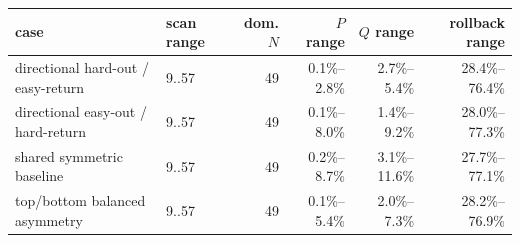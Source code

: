 \begin{tabular}{llrrrr}
\toprule
case & scan range & dom. $N$ & $P$ range & $Q$ range & rollback range \\
\midrule
directional hard-out / easy-return & 9..57 & 49 & 0.1\%--2.8\% & 2.7\%--5.4\% & 28.4\%--76.4\% \\
directional easy-out / hard-return & 9..57 & 49 & 0.1\%--8.0\% & 1.4\%--9.2\% & 28.0\%--77.3\% \\
shared symmetric baseline & 9..57 & 49 & 0.2\%--8.7\% & 3.1\%--11.6\% & 27.7\%--77.1\% \\
top/bottom balanced asymmetry & 9..57 & 49 & 0.1\%--5.4\% & 2.0\%--7.3\% & 28.2\%--76.9\% \\
\bottomrule
\end{tabular}
